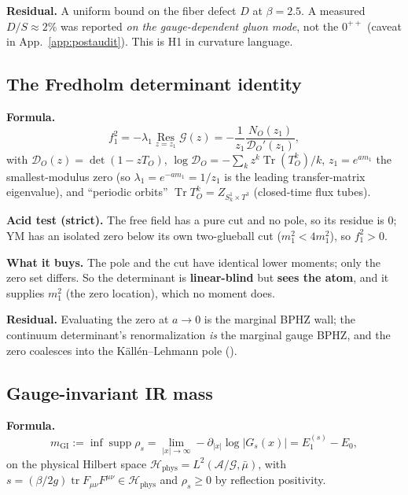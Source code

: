 \textbf{Residual.} A uniform bound on the fiber defect $D$ at $\beta=2.5$. A measured
$D/S\approx2\%$ was reported \emph{on the gauge-dependent gluon mode}, not the $0^{++}$
(caveat in App.~\ref{app:postaudit}). This is H1 in curvature language.

\subsection{The Fredholm determinant identity}

\textbf{Formula.}
\begin{equation}
f_1^2=-\lambda_1\operatorname*{Res}_{z=z_1}\mathcal{G}(z)
=-\frac{1}{z_1}\frac{N_O(z_1)}{\mathcal{D}_O'(z_1)},
\label{eq:fredholm}
\end{equation}
with $\mathcal{D}_O(z)=\det(1-zT_O)$, $\log \mathcal{D}_O=-\sum_k z^k\operatorname{Tr}(T_O^k)/k$,
$z_1=e^{am_1}$ the smallest-modulus zero (so $\lambda_1=e^{-am_1}=1/z_1$ is the leading
transfer-matrix eigenvalue), and ``periodic orbits''
$\operatorname{Tr}T_O^k=Z_{S^1_k\times T^3}$ (closed-time flux tubes).

\textbf{Acid test (strict).} The free field has a pure cut and no pole, so its residue is $0$;
YM has an isolated zero below its own two-glueball cut ($m_1^2<4m_1^2$), so $f_1^2>0$.

\textbf{What it buys.} The pole and the cut have identical lower moments; only the zero set
differs. So the determinant is \textbf{linear-blind} but \textbf{sees the atom}, and it supplies
$m_1^2$ (the zero location), which no moment does.

\textbf{Residual.} Evaluating the zero at $a\to0$ is the marginal BPHZ wall; the continuum
determinant's renormalization \emph{is} the marginal gauge BPHZ, and the zero coalesces into the
Källén--Lehmann pole ().

\subsection{Gauge-invariant IR mass}

\textbf{Formula.}
\begin{equation}
m_{\mathrm{GI}}:=\inf\operatorname{supp}\rho_s
=\lim_{|x|\to\infty}-\partial_{|x|}\log|G_s(x)|=E_1^{(s)}-E_0 ,
\label{eq:mgi}
\end{equation}
on the physical Hilbert space
$\mathcal{H}_{\mathrm{phys}}=L^2(\mathcal{A}/\mathcal{G},\bar\mu)$, with
$s=(\beta/2g)\operatorname{tr}F_{\mu\nu}F^{\mu\nu}\in \mathcal{H}_{\mathrm{phys}}$ and $\rho_s\ge0$ by
reflection positivity.

